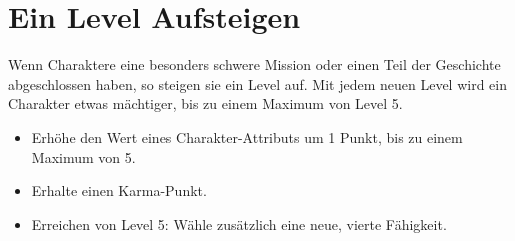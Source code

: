 \section{Ein Level Aufsteigen}
Wenn Charaktere eine besonders schwere Mission oder einen Teil der Geschichte abgeschlossen haben, so steigen sie ein Level auf. Mit jedem neuen Level wird ein Charakter etwas mächtiger, bis zu einem Maximum von Level 5.
\begin{itemize}
\item Erhöhe den Wert eines Charakter-Attributs um 1 Punkt, bis zu einem Maximum von 5.
\item Erhalte einen Karma-Punkt.
\item Erreichen von Level 5: Wähle zusätzlich eine neue, vierte Fähigkeit.
\end{itemize}